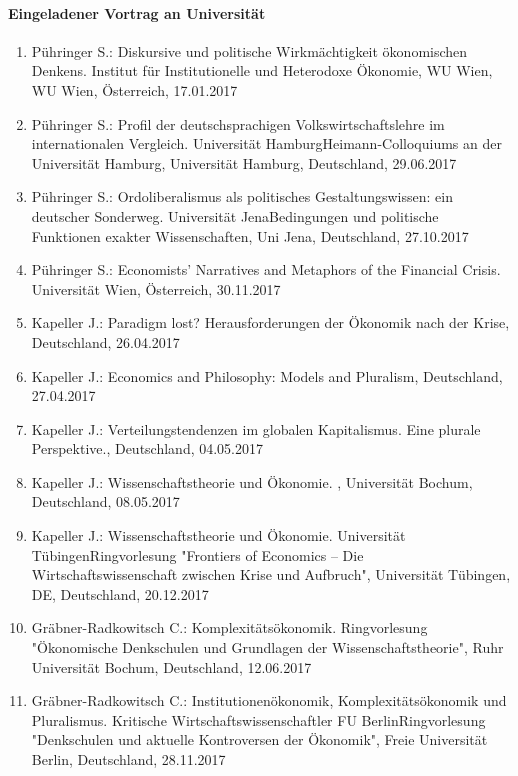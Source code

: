 \paragraph{Eingeladener Vortrag an Universität}
\begin{enumerate}
	\item Pühringer S.: Diskursive und politische Wirkmächtigkeit ökonomischen Denkens. Institut für Institutionelle und Heterodoxe Ökonomie, WU Wien, WU Wien, Österreich, 17.01.2017
	\item Pühringer S.: Profil der deutschsprachigen Volkswirtschaftslehre im internationalen Vergleich. Universität HamburgHeimann-Colloquiums an der Universität Hamburg, Universität Hamburg, Deutschland, 29.06.2017
	\item Pühringer S.: Ordoliberalismus als politisches Gestaltungswissen:  ein deutscher Sonderweg. Universität JenaBedingungen und politische Funktionen exakter Wissenschaften, Uni Jena, Deutschland, 27.10.2017
	\item Pühringer S.: Economists' Narratives and Metaphors of the Financial Crisis. Universität Wien, Österreich, 30.11.2017
	\item Kapeller J.: Paradigm lost? Herausforderungen der Ökonomik nach der Krise, Deutschland, 26.04.2017
	\item Kapeller J.: Economics and Philosophy: Models and Pluralism, Deutschland, 27.04.2017
	\item Kapeller J.: Verteilungstendenzen im globalen Kapitalismus. Eine plurale Perspektive., Deutschland, 04.05.2017
	\item Kapeller J.: Wissenschaftstheorie und Ökonomie. , Universität Bochum, Deutschland, 08.05.2017
	\item Kapeller J.: Wissenschaftstheorie und Ökonomie. Universität TübingenRingvorlesung "Frontiers of Economics – Die Wirtschaftswissenschaft zwischen Krise und Aufbruch", Universität Tübingen, DE, Deutschland, 20.12.2017
	\item Gräbner-Radkowitsch C.: Komplexitätsökonomik. Ringvorlesung "Ökonomische Denkschulen und Grundlagen der Wissenschaftstheorie", Ruhr Universität Bochum, Deutschland, 12.06.2017
	\item Gräbner-Radkowitsch C.: Institutionenökonomik, Komplexitätsökonomik und Pluralismus. Kritische Wirtschaftswissenschaftler FU BerlinRingvorlesung "Denkschulen und aktuelle Kontroversen der Ökonomik", Freie Universität Berlin, Deutschland, 28.11.2017
\end{enumerate}

